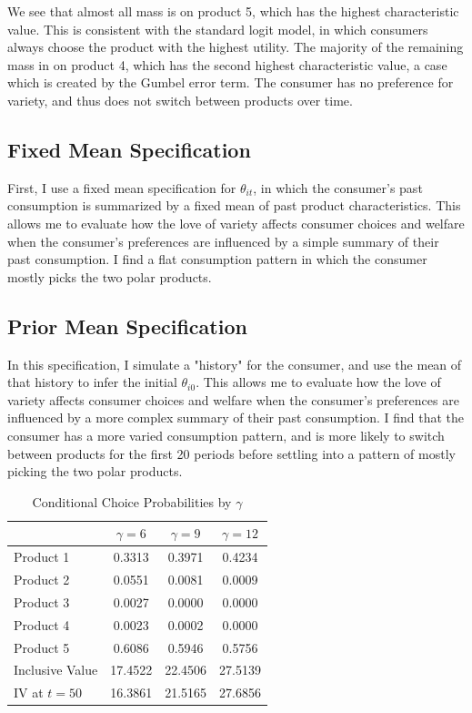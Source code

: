 \documentclass[12pt]{article}
\begin{document}
    

    We see that almost all mass is on product 5, which has the highest characteristic value. This is consistent with the standard logit model, in which consumers always choose the product with the highest utility. The majority of the remaining mass in on product 4, which has the second highest characteristic value, a case which is created by the Gumbel error term. The consumer has no preference for variety, and thus does not switch between products over time.

    \subsection{Fixed Mean Specification}
    First, I use a fixed mean specification for $\theta_{it}$, in which the consumer's past consumption is summarized by a fixed mean of past product characteristics. This allows me to evaluate how the love of variety affects consumer choices and welfare when the consumer's preferences are influenced by a simple summary of their past consumption. I find a flat consumption pattern in which the consumer mostly picks the two polar products.

    \subsection{Prior Mean Specification}
    In this specification, I simulate a "history" for the consumer, and use the mean of that history to infer the initial $\theta_{i0}$. This allows me to evaluate how the love of variety affects consumer choices and welfare when the consumer's preferences are influenced by a more complex summary of their past consumption. I find that the consumer has a more varied consumption pattern, and is more likely to switch between products for the first 20 periods before settling into a pattern of mostly picking the two polar products.

    \begin{table}[h]
    \centering
    \caption{Conditional Choice Probabilities by $\gamma$}
    \begin{tabular}{lccc}
    \hline\hline
    & $\gamma = 6$ & $\gamma = 9$ & $\gamma = 12$ \\
    \hline
    Product 1       & 0.3313  & 0.3971  & 0.4234  \\
    Product 2       & 0.0551  & 0.0081  & 0.0009  \\
    Product 3       & 0.0027  & 0.0000  & 0.0000  \\
    Product 4       & 0.0023  & 0.0002  & 0.0000  \\
    Product 5       & 0.6086  & 0.5946  & 0.5756  \\
    \hline
    Inclusive Value & 17.4522 & 22.4506 & 27.5139 \\
    IV at $t=50$    & 16.3861 & 21.5165 & 27.6856 \\
    \hline\hline
    \end{tabular}
    \end{table}
\end{document}
